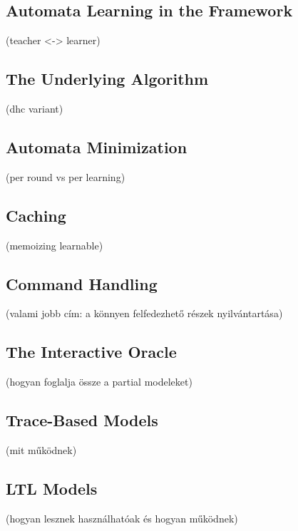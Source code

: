 \subsection{Automata Learning in the Framework} \label{subs_automatalearningintheframework}
(teacher <-> learner)

\subsection{The Underlying Algorithm} \label{subs_dhcintheframework}
(dhc variant)

\subsection{Automata Minimization} \label{subs_minimizationintheframework}
(per round vs per learning)

\subsection{Caching} \label{subs_cachingintheframework}
(memoizing learnable)

\subsection{Command Handling} \label{subs_commandhandling}
(valami jobb cím: a könnyen felfedezhető részek nyilvántartása)

\subsection{The Interactive Oracle} \label{subs_oracle}
(hogyan foglalja össze a partial modeleket)
\subsection{Trace-Based Models} \label{subs_traceintheframework}
(mit működnek)
\subsection{LTL Models} \label{subs_ltlintheframework}
(hogyan lesznek használhatóak és hogyan működnek)